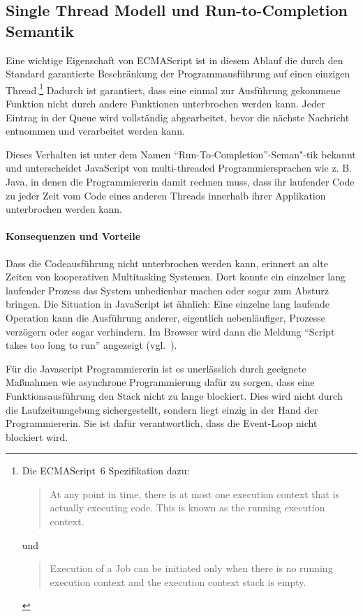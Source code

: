 \documentclass[
11pt, %
a4paper, %
oneside, %
pdfspacing, %
headinclude,
BCOR5mm, %
ngerman, %
bibtotocnumbered,
]{scrartcl}
\begin{document}
	\subsection{Single Thread Modell und Run-to-Completion Semantik}
		Eine wichtige Eigenschaft von ECMAScript ist in diesem Ablauf die durch den Standard garantierte Beschränkung der Programmausführung auf einen einzigen Thread.\footnote{Die ECMAScript~6 Spezifikation dazu:
			\begin{quote}At any point in time, there is at most one execution context that is actually executing code. This is known as the running execution context.~\citep[\S~8.3]{EcmaTC39.}\end{quote} und
			\begin{quote}Execution of a Job can be initiated only when there is no running execution context and the execution context stack is empty.~\citep[\S~8.4]{EcmaTC39.}\end{quote}}
		Dadurch ist garantiert, dass eine einmal zur Ausführung gekommene Funktion nicht durch andere Funktionen unterbrochen werden kann. Jeder Eintrag in der Queue wird vollständig abgearbeitet, bevor die nächste Nachricht entnommen und verarbeitet werden kann.
		
		Dieses Verhalten ist unter dem Namen "`Run-To-Completion"'-Seman"-tik bekannt und unterscheidet JavaScript von multi-threaded Programmiersprachen wie z. B. Java, in denen die Programmiererin damit rechnen muss, dass ihr laufender Code zu jeder Zeit vom Code eines anderen Threads inner\-halb ihrer Applikation unterbrochen werden kann.
		
		\paragraph{Konsequenzen und Vorteile}
		
		Dass die Codeausführung nicht unterbrochen werden kann, erinnert an alte Zeiten von kooperativen Multitasking Systemen. Dort konnte ein einzelner lang laufender Prozess das System unbedienbar machen oder sogar zum Absturz bringen. Die Situation in JavaScript ist ähnlich: Eine einzelne lang laufende Operation kann die Ausführung anderer, eigentlich nebenläufiger, Prozesse verzögern oder sogar verhindern. Im Browser wird dann die Meldung "`Script takes too long to run"' angezeigt (vgl.~\citep{MozillaDeveloperNetwork.2016}). 
		
		Für die Javascript Programmiererin ist es unerlässlich durch geeignete Maßnahmen wie asynchrone Programmierung dafür zu sorgen, dass eine Funktionsausführung den Stack nicht zu lange blockiert. Dies wird nicht durch die Laufzeitumgebung sichergestellt, sondern liegt einzig in der Hand der Programmiererin. Sie ist dafür verantwortlich, dass die Event-Loop nicht blockiert wird. 
		
\end{document}
